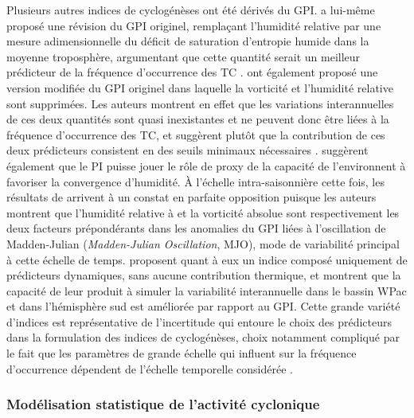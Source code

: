 \documentclass[../main.tex]{subfiles}
\begin{document}
Plusieurs autres indices de cyclogénèses ont été dérivés du GPI. \textcite{emanuel_tropical_2010} a lui-même proposé une révision du GPI originel, remplaçant
l'humidité relative par une mesure adimensionnelle du déficit de saturation d'entropie humide dans la moyenne troposphère, argumentant que cette quantité serait
un meilleur prédicteur de la fréquence d'occurrence des TC \parencite{emanuel_hurricanes_2008}. \textcite{bruyere_investigating_2012} ont également proposé une
version modifiée du GPI originel dans laquelle la vorticité et l'humidité relative sont supprimées. Les auteurs montrent en effet que les variations
interannuelles de ces deux quantités sont quasi inexistantes et ne peuvent donc être liées à la fréquence d'occurrence des TC, et suggèrent plutôt que la
contribution de ces deux prédicteurs consistent en des seuils minimaux nécessaires \parencite{mcgauley_measuring_2011}. \citeauthor{bruyere_investigating_2012}
suggèrent également que le PI puisse jouer le rôle de proxy de la capacité de l'environnent à favoriser la convergence d'humidité. À l'échelle intra-saisonnière
cette fois, les résultats de \textcite{camargo_diagnosis_2009} arrivent à un constat en parfaite opposition puisque les auteurs montrent que l'humidité relative
à  et la vorticité absolue sont respectivement les deux facteurs prépondérants dans les anomalies du GPI liées à l'oscillation de Madden-Julian
(\textit{Madden-Julian Oscillation}, MJO), mode de variabilité principal à cette échelle de temps. \textcite{wang_dynamic_2020} proposent quant à eux un indice
composé uniquement de prédicteurs dynamiques, sans aucune contribution thermique, et montrent que la capacité de leur produit à simuler la variabilité
interannuelle dans le bassin WPac et dans l'hémisphère sud est améliorée par rapport au GPI. Cette grande variété d'indices est représentative de l'incertitude
qui entoure le choix des prédicteurs dans la formulation des indices de cyclogénèses, choix notamment compliqué par le fait que les paramètres de grande échelle
qui influent sur la fréquence d'occurrence dépendent de l'échelle temporelle considérée \parencite{wang_anomalous_2017}.

\subsubsection{Modélisation statistique de l'activité cyclonique}\label{sec:modelisation_stat}
\end{document}
